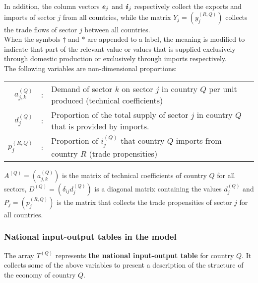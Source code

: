 \documentclass[preprint,authoryear,3p]{elsarticle}
\begin{document}
\noindent In addition, the column vectors $\textbf{\textit{e}}_j$ and $\textbf{\textit{i}}_j$ respectively collect the exports and imports of sector $j$ from all countries, while the matrix $Y_j = \left( y^{(R,Q)}_{j} \right)$ collects the trade flows of sector $j$ between all countries. \\

\noindent When the symbols $\dag$ and $*$ are appended to a label, the meaning is modified to indicate that part of the relevant value or values that is supplied exclusively through domestic production or exclusively through imports respectively. \\

\noindent The following variables are non-dimensional proportions: \vspace{2mm}

\begin{tabular}{rcl}
$a^{(Q)}_{j,k}$ & : & Demand of sector $k$ on sector $j$ in country $Q$ per unit produced (technical coefficients) \vspace{2mm} \\
$d^{(Q)}_j$ & : & Proportion of the total supply of sector $j$ in country $Q$ that is provided by imports. \vspace{2mm} \\
$p^{(R,Q)}_{j}$ & : & Proportion of $i^{(Q)}_j$ that country $Q$ imports from country $R$ (trade propensities) \vspace{2mm}
\end{tabular}

\noindent $A^{(Q)} = \left( a^{(Q)}_{j,k} \right)$ is the matrix of technical coefficients of country $Q$ for all sectors, $D^{(Q)} = \left( \delta_{ij} d^{(Q)}_j \right)$ is a diagonal matrix containing the values $d^{(Q)}_j$ and $P_j = \left( p^{(R,Q)}_{j} \right)$ is the matrix that collects the trade propensities of sector $j$ for all countries.





\subsubsection{National input-output tables in the model}

\noindent The array $T^{(Q)}$ represents \textbf{the national input-output table} for country $Q$. It collects some of the above variables to present a description of the structure of the economy of country $Q$. \vspace{2mm}
\end{document}

